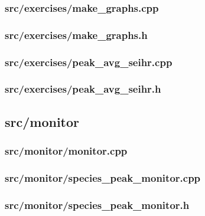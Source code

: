 \subsubsection{src/exercises/make\_graphs.cpp}

\newpage
\subsubsection{src/exercises/make\_graphs.h}

\newpage
\subsubsection{src/exercises/peak\_avg\_seihr.cpp}\label{subsection:peak_avg_seihr}

\newpage
\subsubsection{src/exercises/peak\_avg\_seihr.h}


\newpage
\subsection{src/monitor}
\subsubsection{src/monitor/monitor.cpp}

\newpage
\subsubsection{src/monitor/species\_peak\_monitor.cpp}

\newpage
\subsubsection{src/monitor/species\_peak\_monitor.h}

\newpage
